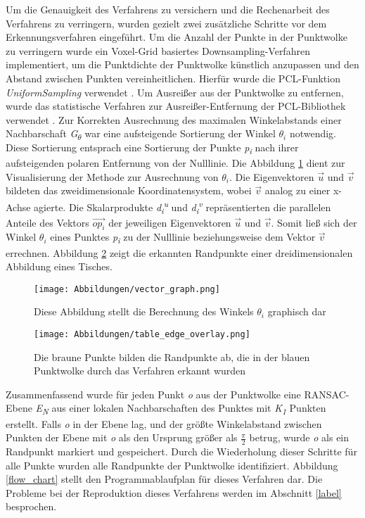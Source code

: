 Um die Genauigkeit des Verfahrens zu versichern und die Rechenarbeit des Verfahrens zu verringern, wurden gezielt zwei zusätzliche Schritte vor dem Erkennungsverfahren eingeführt. Um die Anzahl der Punkte in der Punktwolke zu verringern wurde ein Voxel-Grid basiertes Downsampling-Verfahren implementiert, um die Punktdichte der Punktwolke künstlich anzupassen und den Abstand zwischen Punkten vereinheitlichen. Hierfür wurde die PCL-Funktion \textit{UniformSampling} verwendet \autocite{noauthor_point_2023}. Um Ausreißer aus der Punktwolke zu entfernen, wurde das statistische Verfahren zur Ausreißer-Entfernung der PCL-Bibliothek verwendet \autocite{rusu_towards_2008}. Zur Korrekten Ausrechnung des maximalen Winkelabstands einer Nachbarschaft \textit{G\textsubscript{$\theta$}} war eine aufsteigende Sortierung der Winkel \textit{$\theta_i$} notwendig. Diese Sortierung entsprach eine Sortierung der Punkte \textit{p\textsubscript{i}} nach ihrer aufsteigenden polaren Entfernung von der Nulllinie. Die Abbildung \ref{vector_graph} dient zur Visualisierung der Methode zur Ausrechnung von $\theta_i$. Die Eigenvektoren $\vec{u}$ und $\vec{v}$ bildeten das zweidimensionale Koordinatensystem, wobei $\vec{v}$ analog zu einer x-Achse agierte. Die Skalarprodukte \textit{d\textsubscript{i}\textsuperscript{u}} und \textit{d\textsubscript{i}\textsuperscript{v}} repräsentierten die parallelen Anteile des Vektors $\vec{{op}_i}$ der jeweiligen Eigenvektoren $\vec{u}$ und $\vec{v}$. Somit ließ sich der Winkel $\theta_i$ eines Punktes \textit{p\textsubscript{i}} zu der Nulllinie beziehungsweise dem Vektor $\vec{v}$ errechnen. Abbildung \ref{edge_points_table} zeigt die erkannten Randpunkte einer dreidimensionalen Abbildung eines Tisches.

\begin{figure}[t]
	\texttt{[image: Abbildungen/vector\_graph.png]}
	\centering
	\caption{Diese Abbildung stellt die Berechnung des Winkels $\theta_i$ graphisch dar}
	\label{vector_graph}
\end{figure}

\begin{figure}[h]
	\texttt{[image: Abbildungen/table\_edge\_overlay.png]}
	\centering
	\caption{Die braune Punkte bilden die Randpunkte ab, die in der blauen Punktwolke durch das Verfahren erkannt wurden}
	\label{edge_points_table}
\end{figure}

Zusammenfassend wurde für jeden Punkt \textit{o} aus der Punktwolke eine RANSAC-Ebene \textit{E\textsubscript{N}} aus einer lokalen Nachbarschaften des Punktes mit \textit{K\textsubscript{1}} Punkten erstellt. Falls \textit{o} in der Ebene lag, und der größte Winkelabstand zwischen Punkten der Ebene mit \textit{o} als den Ursprung größer als $\frac{\pi}{2}$ betrug, wurde \textit{o} als ein Randpunkt markiert und gespeichert. Durch die Wiederholung dieser Schritte für alle Punkte wurden alle Randpunkte der Punktwolke identifiziert. Abbildung \ref{flow_chart} stellt den Programmablaufplan für dieses Verfahren dar. Die Probleme bei der Reproduktion dieses Verfahrens werden im Abschnitt \ref{label} besprochen.

